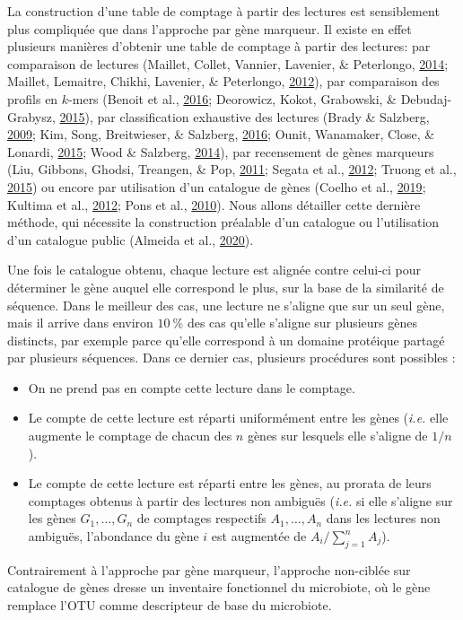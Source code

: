 \documentclass[12pt,a4paper]{reedthesis}
\theoremstyle{definition}
\theoremstyle{definition}
\theoremstyle{definition}
\theoremstyle{remark}
\begin{document}
La construction d'une table de comptage à partir des lectures est sensiblement plus compliquée que dans l'approche par gène marqueur. Il existe en effet plusieurs manières d'obtenir une table de comptage à partir des lectures: par comparaison de lectures (Maillet, Collet, Vannier, Lavenier, \& Peterlongo, \protect\hyperlink{ref-maillet2014commet}{2014}; Maillet, Lemaitre, Chikhi, Lavenier, \& Peterlongo, \protect\hyperlink{ref-maillet2012compareads}{2012}), par comparaison des profils en \(k\)-mers (Benoit et al., \protect\hyperlink{ref-benoit2016multiple}{2016}; Deorowicz, Kokot, Grabowski, \& Debudaj-Grabysz, \protect\hyperlink{ref-deorowicz2015kmc}{2015}), par classification exhaustive des lectures (Brady \& Salzberg, \protect\hyperlink{ref-brady2009phymm}{2009}; Kim, Song, Breitwieser, \& Salzberg, \protect\hyperlink{ref-kim2016centrifuge}{2016}; Ounit, Wanamaker, Close, \& Lonardi, \protect\hyperlink{ref-ounit2015clark}{2015}; Wood \& Salzberg, \protect\hyperlink{ref-wood2014kraken}{2014}), par recensement de gènes marqueurs (Liu, Gibbons, Ghodsi, Treangen, \& Pop, \protect\hyperlink{ref-liu2011accurate}{2011}; Segata et al., \protect\hyperlink{ref-segata2012metagenomic}{2012}; Truong et al., \protect\hyperlink{ref-truong2015metaphlan2}{2015}) ou encore par utilisation d'un catalogue de gènes (Coelho et al., \protect\hyperlink{ref-coelho2019ng}{2019}; Kultima et al., \protect\hyperlink{ref-kultima2012mocat}{2012}; Pons et al., \protect\hyperlink{ref-pons2010meteor}{2010}). Nous allons détailler cette dernière méthode, qui nécessite la construction préalable d'un catalogue ou l'utilisation d'un catalogue public (Almeida et al., \protect\hyperlink{ref-almeida2020unified}{2020}).

Une fois le catalogue obtenu, chaque lecture est alignée contre celui-ci pour déterminer le gène auquel elle correspond le plus, sur la base de la similarité de séquence. Dans le meilleur des cas, une lecture ne s'aligne que sur un seul gène, mais il arrive dans environ \(10~\%\) des cas qu'elle s'aligne sur plusieurs gènes distincts, par exemple parce qu'elle correspond à un domaine protéique partagé par plusieurs séquences. Dans ce dernier cas, plusieurs procédures sont possibles :
\begin{itemize}
\item
  On ne prend pas en compte cette lecture dans le comptage.
\item
  Le compte de cette lecture est réparti uniformément entre les gènes (\emph{i.e.} elle augmente le comptage de chacun des \(n\) gènes sur lesquels elle s'aligne de \(1/n\)).
\item
  Le compte de cette lecture est réparti entre les gènes, au prorata de leurs comptages obtenus à partir des lectures non ambiguës (\emph{i.e.} si elle s'aligne sur les gènes \(G_1, \dots, G_n\) de comptages respectifs \(A_1, \dots, A_n\) dans les lectures non ambiguës, l'abondance du gène \(i\) est augmentée de \(A_i / \sum_{j=1}^n A_j\)).
\end{itemize}
Contrairement à l'approche par gène marqueur, l'approche non-ciblée sur catalogue de gènes dresse un inventaire fonctionnel du microbiote, où le gène remplace l'OTU comme descripteur de base du microbiote.
\end{document}
